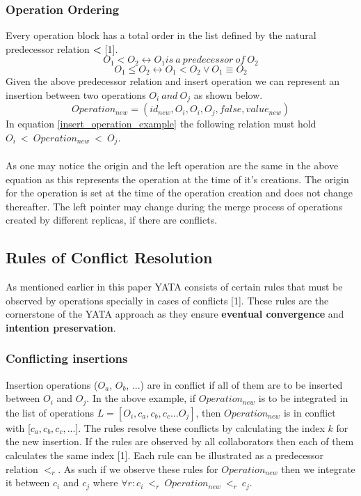\documentclass[9pt, titlepage]{article}
\begin{document}
  \subsubsection{Operation Ordering}
  Every operation block has a total order in the list defined by the natural predecessor relation \textbf{<} [1].
  \begin{equation}
    O_{1} < O_{2} \leftrightarrow O_{1} is\ a\ predecessor\ of\ O_{2}
  \end{equation}
  \begin{equation}
    O_{1} \leq O_{2} \leftrightarrow O_{1} < O_{2} \lor O_{1} \equiv O_{2}
  \end{equation}
  Given the above predecessor relation and insert operation we can represent an insertion between two operations \(O_{i}\ and\ O_{j}\) as shown below.
  \begin{equation} \label{insert_operation_example}
    Operation_{new} = (id_{new}, O_{i}, O_{i}, O_{j}, false, value_{new})
  \end{equation}
  In equation \ref{insert_operation_example} the following relation must hold \(O_{i}\ <\ Operation_{new}\ <\ O_{j}\).\\\\
  As one may notice the origin and the left operation are the same in the above equation as this represents the operation at the time of it's creations.
  The origin for the operation is set at the time of the operation creation and does not change thereafter.
  The left pointer may change during the merge process of operations created by different replicas, if there are conflicts.

  \subsection{Rules of Conflict Resolution}
  As mentioned earlier in this paper YATA consists of certain rules that must be observed by operations specially in cases of conflicts [1].
  These rules are the cornerstone of the YATA approach as they ensure \textbf{eventual convergence} and \textbf{intention preservation}.

  \subsubsection{Conflicting insertions}
  Insertion operations (\(O_{a}\), \(O_{b}\), ...) are in conflict if all of them are to be inserted between \(O_{i}\) and \(O_{j}\).
  In the above example, if \(Operation_{new}\) is to be integrated in the list of operations \(L = [O_{i}, c_{a}, c_{b}, c_{c}... O_{j}]\),
  then \(Operation_{new}\) is in conflict with [\(c_{a}, c_{b}, c_{c}, ...\)]. The rules resolve these conflicts by calculating the index \(k\) for the new insertion.
  If the rules are observed by all collaborators then each of them calculates the same index [1]. Each rule can be illustrated as a predecessor relation \(<_{r}\).
  As such if we observe these rules for \(Operation_{new}\) then we integrate it between \(c_{i}\) and \(c_{j}\) where \(\forall r: c_{i}\ <_{r}\ Operation_{new}\ <_{r}\ c_{j}\).
\end{document}
